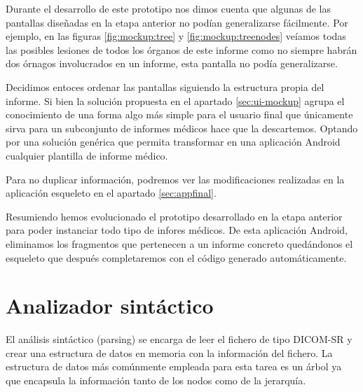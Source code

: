 Durante el desarrollo de este prototipo nos dimos cuenta que algunas de las pantallas diseñadas en la etapa anterior no podían generalizarse fácilmente. Por ejemplo, en las figuras  \ref{fig:mockup:tree} y \ref{fig:mockup:treenodes}  veíamos todas las posibles lesiones de todos los órganos de este informe como no siempre habrán dos órnagos involucrados en un informe, esta pantalla no podía generalizarse.\par
Decidimos entoces ordenar las pantallas siguiendo la estructura propia del informe. Si bien la solución propuesta en el apartado \ref{sec:ui-mockup} agrupa el conocimiento de una forma algo más simple para el usuario final que únicamente sirva para un subconjunto de informes médicos hace que la descartemos. Optando por una solución genérica que permita transformar en una aplicación Android cualquier plantilla de informe médico.\medskip\par  

Para no duplicar información, podremos ver las modificaciones realizadas en la aplicación esqueleto en el apartado \ref{sec:appfinal}.\par
Resumiendo hemos evolucionado el prototipo desarrollado en la etapa anterior para poder instanciar todo tipo de infores médicos. De esta aplicación Android, eliminamos los fragmentos que pertenecen a un informe concreto quedándonos el esqueleto que después completaremos con el código generado automáticamente. 


\section{Analizador sintáctico}
El análisis sintáctico (parsing) se encarga de leer el fichero de tipo DICOM-SR y crear una estructura de datos en memoria con la información del fichero. La estructura de datos más comúnmente empleada para esta tarea es un  árbol ya que encapsula la información tanto de los nodos como de la jerarquía.\medskip\par

